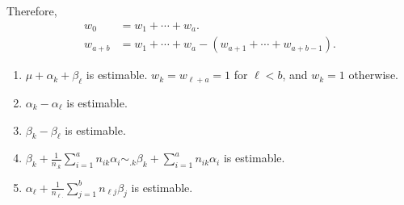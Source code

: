 Therefore,
\begin{align*}
    w_0     & =w_1+\cdots+w_a.                            \\
    w_{a+b} & =w_1+\cdots+w_a-(w_{a+1}+\cdots+w_{a+b-1}).
\end{align*}
\begin{enumerate}[(1)]
    \item $ \mu+\alpha_k+\beta_\ell $ is estimable. $ w_k=w_{\ell+a}=1 $ for $ \ell<b $, and $ w_k=1 $ otherwise.
    \item $ \alpha_k-\alpha_\ell $ is estimable.
    \item $ \beta_k-\beta_\ell $ is estimable.
    \item $ \beta_k+\frac{1}{n_{.k}}\sum_{i=1}^{a}n_{ik}\alpha_i\sim _{.k}\beta_k+\sum_{i=1}^{a}n_{ik}\alpha_i $ is estimable.
    \item $ \alpha_\ell+\frac{1}{n_{\ell.}}\sum_{j=1}^{b}n_{\ell j}\beta_j $ is estimable.
\end{enumerate}